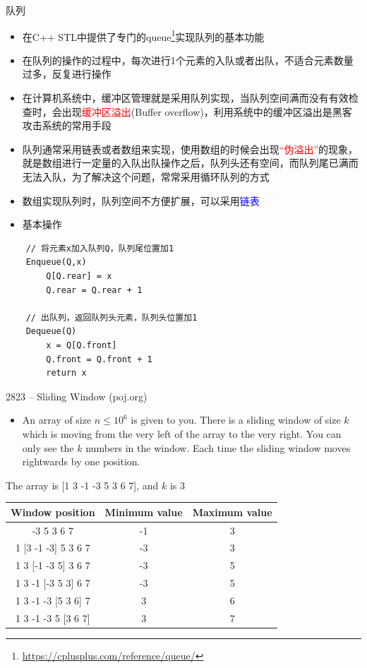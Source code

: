 \begin{frame}{队列}
    \begin{itemize}
        \item 在C++ STL中提供了专门的queue\footnote{\url{https://cplusplus.com/reference/queue/}}实现队列的基本功能
        \item 在队列的操作的过程中，每次进行1个元素的入队或者出队，不适合元素数量过多，反复进行操作
        \item 在计算机系统中，缓冲区管理就是采用队列实现，当队列空间满而没有有效检查时，会出现\textcolor{red}{缓冲区溢出}(Buffer overflow)，利用系统中的缓冲区溢出是黑客攻击系统的常用手段
        \item 队列通常采用链表或者数组来实现，使用数组的时候会出现\textcolor{red}{“伪溢出”}的现象，就是数组进行一定量的入队出队操作之后，队列头还有空间，而队列尾已满而无法入队，为了解决这个问题，常常采用循环队列的方式
        \item 数组实现队列时，队列空间不方便扩展，可以采用\textcolor{blue}{链表}
    \end{itemize}
\end{frame}    
\vspace*{6ex}
\begin{itemize}
    \item[] \Large{基本操作}
\end{itemize}
\begin{lstlisting}
    // 将元素x加入队列Q，队列尾位置加1
    Enqueue(Q,x)
        Q[Q.rear] = x
        Q.rear = Q.rear + 1
        
    // 出队列，返回队列头元素，队列头位置加1
    Dequeue(Q)
        x = Q[Q.front]
        Q.front = Q.front + 1
        return x
\end{lstlisting}
\begin{frame}{2823 -- Sliding Window (poj.org)}
    \begin{itemize}
        \item An array of size $n\leqslant10^6$ is given to you. There is a sliding window of size $k$ which is moving from the very left of the array to the very right. You can only see the $k$ numbers in the window. Each time the sliding window moves rightwards by one position. 
    \end{itemize}
    \begin{exampleblock}{The array is [1 3 -1 -3 5 3 6 7], and $k$ is 3}
    \begin{table}
    \begin{tabular}{ccc}
        Window position & Minimum value & Maximum value\\
        \hline
        [1 3 -1] -3 5 3 6 7 & -1 & 3 \\
        1 [3 -1 -3] 5 3 6 7	& -3 & 3 \\
        1 3 [-1 -3 5] 3 6 7	& -3 & 5 \\ 
        1 3 -1 [-3 5 3] 6 7	& -3 & 5 \\
        1 3 -1 -3 [5 3 6] 7	& 3 & 6 \\
        1 3 -1 -3 5 [3 6 7]	& 3 & 7 \\
        \hline
    \end{tabular}
    \end{table}
    \end{exampleblock}
\end{frame}
